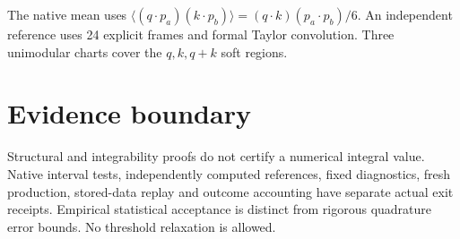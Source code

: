 \documentclass[11pt]{article}
\begin{document}
The native mean uses
$\langle(q\cdot p_a)(k\cdot p_b)\rangle=(q\cdot k)(p_a\cdot p_b)/6$.
An independent reference uses 24 explicit frames and formal Taylor convolution.
Three unimodular charts cover the $q,k,q+k$ soft regions.

\section*{Evidence boundary}
Structural and integrability proofs do not certify a numerical integral value.
Native interval tests, independently computed references, fixed diagnostics,
fresh production, stored-data replay and outcome accounting have separate actual
exit receipts. Empirical statistical acceptance is distinct from rigorous
quadrature error bounds. No threshold relaxation is allowed.
\end{document}
